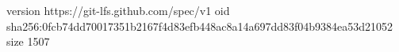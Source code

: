 version https://git-lfs.github.com/spec/v1
oid sha256:0fcb74dd70017351b2167f4d83efb448ac8a14a697dd83f04b9384ea53d21052
size 1507
